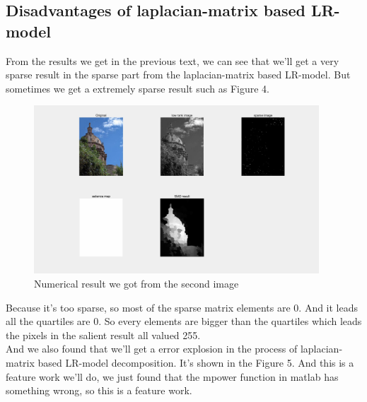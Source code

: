 \documentclass{article}
\begin{document}
\subsection{Disadvantages of laplacian-matrix based LR-model}
From the results we get in the previous text, we can see that we'll get a very 
sparse result in the sparse part from the laplacian-matrix based LR-model. But 
sometimes we get a extremely sparse result such as Figure 4. 
\begin{figure}[htbp]
	\centering
	\includegraphics[width=0.95\textwidth]{strange.pdf}
	\caption{Numerical result we got from the second image}
\end{figure}
Because it's too sparse, so most of the sparse matrix elements are 0. And it 
leads all the quartiles are 0. So every elements are bigger than the quartiles 
which leads the pixels in the salient result all valued 255.\\
And we also found that we'll get a error explosion in the process of 
laplacian-matrix based LR-model decomposition. It's shown in the Figure 5. And 
this is a feature work we'll do, we just found that the mpower function in 
matlab has something wrong, so this is a feature work.
\end{document}
